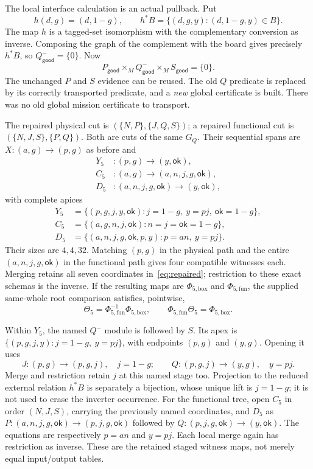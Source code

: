 \documentclass[11pt]{article}
\newcommand{\ok}{\mathsf{ok}}
\newcommand{\good}{\mathsf{good}}
\begin{document}
The local interface calculation is an actual pullback. Put
\[
 h(d,g)=(d,1-g),\qquad
 h^*B=\{(d,g,y):(d,1-g,y)\in B\}.
\]
The map $h$ is a tagged-set isomorphism with the complementary conversion as
inverse. Composing the graph of the complement with the board gives precisely
$h^*B$, so $Q^-_{\good}=\{0\}$. Now
\[
 P_{\good}\times_M Q^-_{\good}\times_M S_{\good}=\{0\}.
\]
The unchanged $P$ and $S$ evidence can be reused. The old $Q$ predicate is
replaced by its correctly transported predicate, and a \emph{new} global
certificate is built. There was no old global mission certificate to transport.

The repaired physical cut is $(\{N,P\},\{J,Q,S\})$; a repaired functional cut is
$(\{N,J,S\},\{P,Q\})$. Both are cuts of the same $G_Q$. Their sequential spans
are $X:(a,g)\to(p,g)$ as before and
\[
\begin{aligned}
 Y_5 &: (p,g)\longrightarrow(y,\ok),\\
 C_5 &: (a,g)\longrightarrow(a,n,j,g,\ok),\\
 D_5 &: (a,n,j,g,\ok)\longrightarrow(y,\ok),
\end{aligned}
\]
with complete apices
\[
\begin{aligned}
 Y_5&=\{(p,g,j,y,\ok):j=1-g,\ y=pj,\ \ok=1-g\},\\
 C_5&=\{(a,g,n,j,\ok):n=j=\ok=1-g\},\\
 D_5&=\{(a,n,j,g,\ok,p,y):p=an,\ y=pj\}.
\end{aligned}
\]
Their sizes are $4,4,32$. Matching $(p,g)$ in the physical path and the entire
$(a,n,j,g,\ok)$ in the functional path gives four compatible witnesses each.
Merging retains all seven coordinates in~\eqref{eq:repaired}; restriction to
these exact schemas is the inverse. If the resulting maps are
$\Phi_{5,\mathrm{box}}$ and $\Phi_{5,\mathrm{fun}}$, the supplied same-whole
root comparison satisfies, pointwise,
\[
 \Theta_5=\Phi_{5,\mathrm{fun}}^{-1}\Phi_{5,\mathrm{box}},
 \qquad
 \Phi_{5,\mathrm{fun}}\Theta_5=\Phi_{5,\mathrm{box}}.
\]

Within $Y_5$, the named $Q^-$ module is followed by $S$. Its apex is
$\{(p,g,j,y):j=1-g,\ y=pj\}$, with endpoints $(p,g)$ and $(y,g)$.
Opening it uses
\[
 J:(p,g)\longrightarrow(p,g,j),\quad j=1-g;
 \qquad Q:(p,g,j)\longrightarrow(y,g),\quad y=pj.
\]
Merge and restriction retain $j$ at this named stage too. Projection to the
reduced external relation $h^*B$ is separately a bijection, whose unique lift
is $j=1-g$; it is not used to erase the inverter occurrence. For the functional
tree, open $C_5$ in order $(N,J,S)$, carrying the previously named coordinates,
and $D_5$ as
$P:(a,n,j,g,\ok)\to(p,j,g,\ok)$ followed by
$Q:(p,j,g,\ok)\to(y,\ok)$. The equations are respectively $p=an$ and $y=pj$.
Each local merge again has restriction as inverse. These are the retained
staged witness maps, not merely equal input/output tables.
\end{document}
